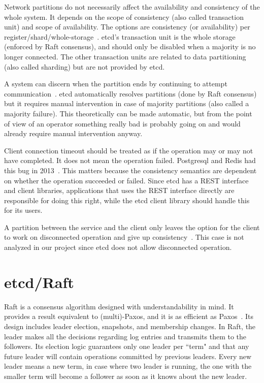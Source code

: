 \documentclass[12pt,conference]{IEEEtran}
\begin{document}
Network partitions do not necessarily affect the availability and consistency of the whole system. It depends on the scope of consistency (also called transaction unit) and scope of availability. The options are consistency (or availability) per register/shard/whole-storage~\cite{brewer2012cap}. etcd's transaction unit is the whole storage (enforced by Raft consensus), and should only be disabled when a majority is no longer connected. The other transaction units are related to data partitioning (also called sharding) but are not provided by etcd.

A system can discern when the partition ends by continuing to attempt communication~\cite{brewer2012cap}. etcd automatically resolves partitions (done by Raft consensus) but it requires manual intervention in case of majority partitions (also called a majority failure). This theoretically can be made automatic, but from the point of view of an operator something really bad is probably going on and would already require manual intervention anyway.

Client connection timeout should be treated as if the operation may or may not have completed. It does not mean the operation failed. Postgresql and Redis had this bug in 2013~\cite{postgresJepsenPostWebsite}. This matters because the consistency semantics are dependent on whether the operation succeeded or failed. Since etcd has a REST interface and client libraries, applications that uses the REST interface directly are responsible for doing this right, while the etcd client library should handle this for its users.

A partition between the service and the client only leaves the option for the client to work on disconnected operation and give up consistency~\cite{brewer2012cap}. This case is not analyzed in our project since etcd does not allow disconnected operation.

\section{etcd/Raft}

Raft is a consensus algorithm designed with understandability in mind. It provides a result equivalent to (multi)-Paxos, and it is as efficient as Paxos~\cite{ongaro2014search}. Its design includes leader election, snapshots, and membership changes. In Raft, the leader makes all the decisions regarding log entries and transmits them to the followers. Its election logic guarantees only one leader per “term" and that any future leader will contain operations committed by previous leaders. Every new leader means a new term, in case where two leader is running, the one with the smaller term will become a follower as soon as it knows about the new leader.
\end{document}
